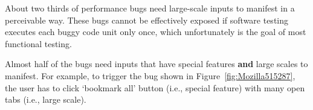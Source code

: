 About two thirds of performance bugs need large-scale inputs to manifest in
a perceivable way. These bugs cannot be effectively exposed if 
software testing executes each buggy code unit only once,
which unfortunately is the goal of most functional testing.

Almost half of the bugs need inputs that have special features {\bf and} 
large scales to manifest. 
For example, to trigger the bug shown in Figure~\ref{fig:Mozilla515287}, the user
has to click `bookmark all' button (i.e., special feature) with many open
tabs (i.e., large scale).

